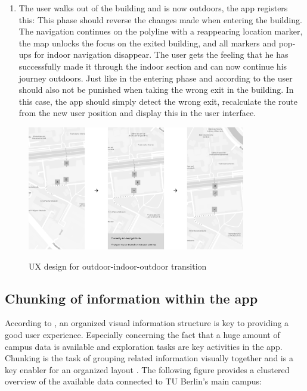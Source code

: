\begin{enumerate}
    \item The user walks out of the building and is now outdoors, the app registers this: This phase should reverse the changes made when entering the building. The navigation continues on the polyline with a reappearing location marker, the map unlocks the focus on the exited building, and all markers and pop-ups for indoor navigation disappear. The user gets the feeling that he has successfully made it through the indoor section and can now continue his journey outdoors. Just like in the entering phase and according to \cite{postels_law} the user should also not be punished when taking the wrong exit in the building. In this case, the app should simply detect the wrong exit, recalculate the route from the new user position and display this in the user interface.
\end{enumerate}

\begin{figure}[H]
	\centering
	\includegraphics[width=0.85\textwidth]{images/indoor_navigation_phases.png}\\
	\caption{UX design for outdoor-indoor-outdoor transition}
\end{figure}

\subsection{Chunking of information within the app}
According to \cite{millers_law}, an organized visual information structure is key to providing a good user experience. Especially concerning the fact that a huge amount of campus data is available and exploration tasks are key activities in the app. Chunking is the task of grouping related information visually together and is a key enabler for an organized layout \cite{millers_law}. The following figure provides a clustered overview of the available data connected to TU Berlin's main campus:

